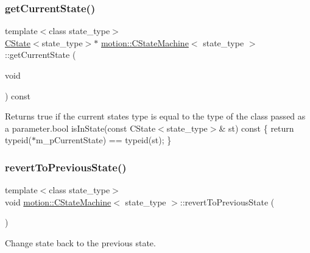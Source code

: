 \subsubsection{\texorpdfstring{get\+Current\+State()}{getCurrentState()}}
{\footnotesize\ttfamily template$<$class state\+\_\+type$>$ \\
\mbox{\hyperlink{classmotion_1_1CState}{C\+State}}$<$state\+\_\+type$>$$\ast$ \mbox{\hyperlink{classmotion_1_1CStateMachine}{motion\+::\+C\+State\+Machine}}$<$ state\+\_\+type $>$\+::get\+Current\+State (\begin{DoxyParamCaption}\item[{void}]{ }\end{DoxyParamCaption}) const\hspace{0.3cm}{\ttfamily [inline]}}

Returns true if the current state\textquotesingle{}s type is equal to the type of the class passed as a parameter.\+bool is\+In\+State(const C\+State$<$state\+\_\+type$>$\& st) const \{ return typeid($\ast$m\+\_\+p\+Current\+State) == typeid(st); \} \mbox{\label{classmotion_1_1CStateMachine_ae8e1d802793aded65b1da25dad007486}} 
\subsubsection{\texorpdfstring{revert\+To\+Previous\+State()}{revertToPreviousState()}}
{\footnotesize\ttfamily template$<$class state\+\_\+type$>$ \\
void \mbox{\hyperlink{classmotion_1_1CStateMachine}{motion\+::\+C\+State\+Machine}}$<$ state\+\_\+type $>$\+::revert\+To\+Previous\+State (\begin{DoxyParamCaption}{ }\end{DoxyParamCaption})\hspace{0.3cm}{\ttfamily [inline]}}

Change state back to the previous state. \mbox{\label{classmotion_1_1CStateMachine_a57407660e1054b7b6e912efc3afb9495}} 
